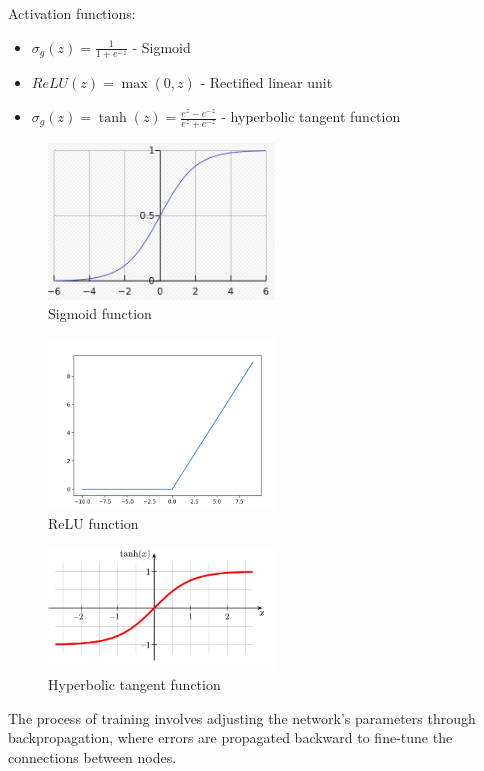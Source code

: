 \documentclass[12pt]{report}
\begin{document}
Activation functions:
\begin{itemize}
	\item $\sigma_g(z) = \frac{1}{1+e^{-z}}$ - Sigmoid 
	\item $ReLU(z) = \max(0, z)$ - Rectified linear unit
	\item $\sigma_g(z) = \tanh(z) = \frac{e^z-e^{-z}}{e^z+e^{-z}}$ - hyperbolic tangent function 
\end{itemize}	
\begin{figure}[H]\centering\includegraphics[width=6cm]{sigmoid.png}\caption{Sigmoid function}\end{figure}
\begin{figure}[H]\centering\includegraphics[width=6cm]{RELU.png}\caption{ReLU function}\end{figure}
\begin{figure}[H]\centering\includegraphics[width=6cm]{tanh.png}\caption{Hyperbolic tangent function}\end{figure}



The process of training involves adjusting the network's parameters through backpropagation, where errors are propagated backward to fine-tune the connections between nodes.\\
\end{document}
